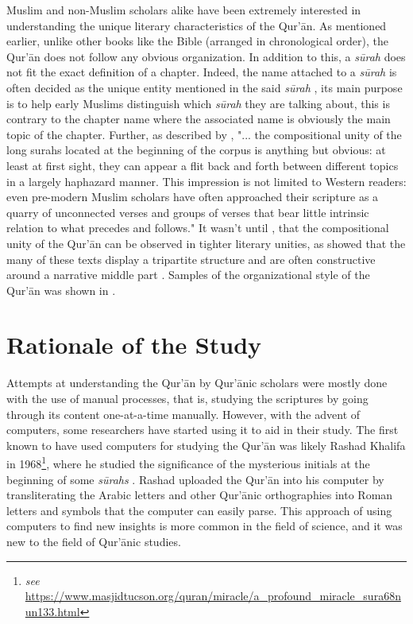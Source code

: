 Muslim and non-Muslim scholars alike have been extremely interested in understanding the unique literary characteristics of the Qur'\=an. As mentioned earlier, unlike other books like the Bible (arranged in chronological order), the Qur'\=an does not follow any obvious organization. In addition to this, a \textit{s\=urah}  does not fit the exact definition of a chapter. Indeed, the name attached to a \textit{s\=urah}  is often decided as the unique entity mentioned in the said \textit{s\=urah} , its main purpose is to help early Muslims distinguish which \textit{s\=urah}  they are talking about, this is contrary to the chapter name where the associated name is obviously the main topic of the chapter. Further, as described by , "... the compositional unity of the long surahs located at the beginning of the corpus is anything but obvious: at least at first sight, they can appear a flit back and forth between different topics in a largely haphazard manner. This impression is not limited to Western readers: even pre-modern Muslim scholars have often approached their scripture as a quarry of unconnected verses and groups of verses that bear little intrinsic relation to what precedes and follows." It wasn't until , that the compositional unity of the Qur'\=an can be observed in tighter literary unities, as  showed that the many of these texts display a tripartite structure and are often constructive around a narrative middle part \cite{sinai2017}. Samples of the organizational style of the Qur'\=an was shown in .

\section{Rationale of the Study}\label{sec:rationale}
Attempts at understanding the Qur'\=an by Qur'\=anic scholars were mostly done with the use of manual processes, that is, studying the scriptures by going through its content one-at-a-time manually. However, with the advent of computers, some researchers have started using it to aid in their study. The first known to have used computers for studying the Qur'\=an was likely Rashad Khalifa in 1968\footnote{\textit{see} \url{https://www.masjidtucson.org/quran/miracle/a_profound_miracle_sura68nun133.html}}, where he studied the significance of the mysterious initials at the beginning of some \textit{s\=urahs} . Rashad uploaded the Qur'\=an into his computer by transliterating the Arabic letters and other Qur'\=anic orthographies into Roman letters and symbols that the computer can easily parse. This approach of using computers to find new insights is more common in the field of science, and it was new to the field of Qur'\=anic studies.

